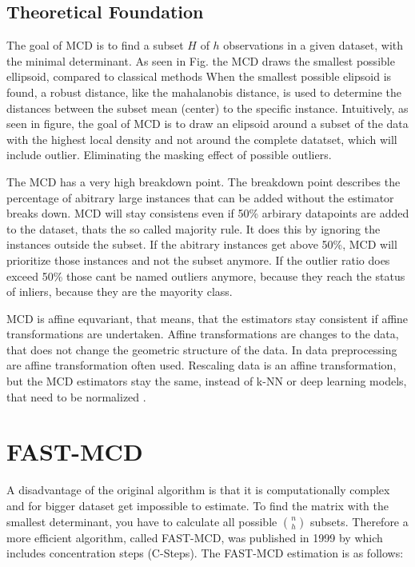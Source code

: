 \subsection*{Theoretical Foundation}
The goal of MCD is to find a subset $H$ of $h$  observations in a given dataset, with the minimal determinant.
As seen in Fig. the MCD draws the smallest possible ellipsoid, compared to classical methods 
When the smallest possible elipsoid is found, a robust distance, like the mahalanobis distance, is used to determine the distances between the subset mean (center) to the specific instance.
Intuitively,  as seen in figure, the goal of MCD is to draw an elipsoid around a subset of the data with the highest local density and not around the complete datatset, which will include outlier. 
Eliminating the masking effect of possible outliers.




The MCD has a very high breakdown point.
The breakdown point describes the percentage of abitrary large instances that can be added without the estimator breaks down.
MCD will stay consistens even if 50\% arbirary datapoints are added to the dataset, thats the so called majority rule.
It does this by ignoring the instances outside the subset.
If the abitrary instances get above 50\%, MCD will prioritize those instances and not the subset anymore.
If the outlier ratio does exceed 50\% those cant be named outliers anymore, because they reach the status of inliers, because they are the mayority class. 


MCD is affine equvariant, that means, that the estimators stay consistent if affine transformations are undertaken.
Affine transformations are changes to the data, that does not change the geometric structure of the data.
In data preprocessing are affine transformation often used.
Rescaling data is an affine transformation, but the MCD estimators stay the same, instead of k-NN or deep learning models, that need to be normalized \citet{hubert2018minimum}.
  


\section*{FAST-MCD}
A disadvantage of the original algorithm is that it is computationally complex and for bigger dataset get impossible to estimate.
To find the matrix with the smallest determinant, you have to calculate all possible $\binom{n}{h}$ subsets.  
Therefore a more efficient algorithm, called FAST-MCD, was published in 1999 by \citet{rousseeuw1999fast} which includes concentration steps (C-Steps).
The FAST-MCD estimation is as follows:  

